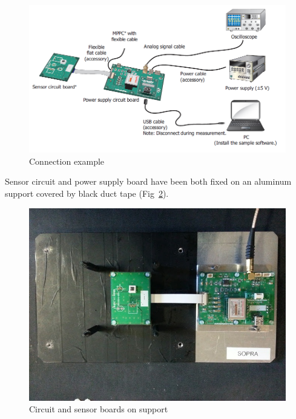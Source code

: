\documentclass[10pt,a4paper, openany]{book}
\begin{document}
\begin{figure}[!h]
\begin{center}
\includegraphics[scale=0.5]{imm/mppc.png}
\end{center}
\caption{Connection example}
\label{fig:mppc}
\end{figure}

Sensor circuit and power supply board have been both fixed on an aluminum support covered by black duct tape (Fig~\ref{fig:mppc2}).
\begin{figure}[!h]
\begin{center}
\includegraphics[scale=0.5]{imm/mppc2.jpg}
\end{center}
\caption{Circuit and sensor boards on support}
\label{fig:mppc2}
\end{figure}
\end{document}
